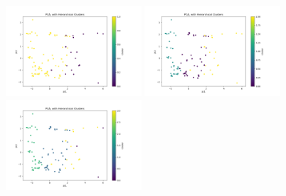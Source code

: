 \documentclass{article}
\begin{document}
\begin{figure}[h]
\centering
\includegraphics[width=0.45\textwidth]{./pca_h_k2.png}
\includegraphics[width=0.45\textwidth]{./pca_h_k3.png}
\includegraphics[width=0.45\textwidth]{./pca_h_k4.png}
\end{figure}
\end{document}
